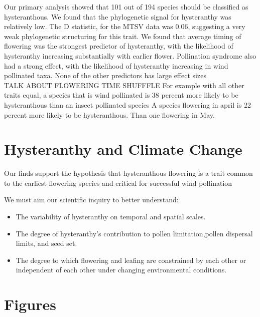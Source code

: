 \documentclass{article}\usepackage[]{graphicx}\usepackage[]{color}
\begin{document}
Our primary analysis showed that 101 out of 194 species should be classified as hysteranthous. We found that the phylogenetic signal for hysteranthy was relatively low. The D statistic, for the MTSV data was 0.06, suggesting a very weak phylogenetic structuring for this trait. We found that average timing of flowering was the strongest predictor of hysteranthy, with the likelihood of hysteranthy increasing substantially with earlier flower. Pollination syndrome also had a strong effect, with the likelihood of hysteranthy increasing in wind pollinated taxa. None of the other predictors has large effect sizes\\
TALK ABOUT FLOWERING TIME SHUFFFLE
For example with all other traits equal, a species that is wind pollinated is 38 percent more likely to be hysteranthous than an insect pollinated species
A species flowering in april is 22 percent more likely to be hysteranthous. Than one flowering in May.

\section*{Hysteranthy and Climate Change}
Our finds support the hypothesis that hysteranthous flowering is a trait common to the earliest flowering species and critical for successful wind pollination

We must aim our scientific inquiry to better understand: 
\begin{itemize}
\item The variability of hysteranthy on temporal and spatial scales.
\item The degree of hysteranthy's contribution to pollen limitation,pollen dispersal limits, and seed set.
\item The degree to which flowering and leafing are constrained by each other or independent of each other under changing environmental conditions.
\end{itemize}

\section*{Figures}
\end{document}
